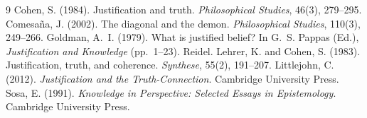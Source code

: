 \documentclass{situationist-preprint}
\begin{document}
\begin{thebibliography}{9}\small
{} Cohen, S. (1984). Justification and truth. \emph{Philosophical Studies}, 46(3), 279--295.
 Comesa{\~n}a, J. (2002). The diagonal and the demon. \emph{Philosophical Studies}, 110(3), 249--266.
 Goldman, A.~I. (1979). What is justified belief? In G.~S. Pappas (Ed.), \emph{Justification and Knowledge} (pp.~1--23). Reidel.
 Lehrer, K. and Cohen, S. (1983). Justification, truth, and coherence. \emph{Synthese}, 55(2), 191--207.
 Littlejohn, C. (2012). \emph{Justification and the Truth-Connection}. Cambridge University Press.
 Sosa, E. (1991). \emph{Knowledge in Perspective: Selected Essays in Epistemology}. Cambridge University Press.
\end{thebibliography}
\end{document}
